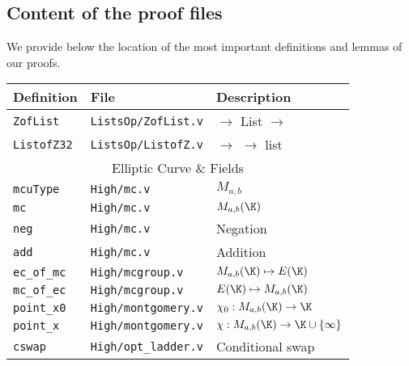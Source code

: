 
\subsection{Content of the proof files}
\label{appendix:proof-files}

We provide below the location of the most important definitions and lemmas of our proofs.

\begin{table*}[h]
  \begin{tabular}{ l | l | l }
    Definition & File & Description \\
    \hline
    \texttt{ZofList} & \texttt{ListsOp/ZofList.v} & \Z $\rightarrow$ List \Z $\rightarrow$ \Z\\
    \texttt{ListofZ32} & \texttt{ListsOp/ListofZ.v} & \Z $\rightarrow$  \Z $\rightarrow$ list \Z\\
    \hline
    \multicolumn{3}{c}{Elliptic Curve \& Fields }\\
    \hline
    \texttt{mcuType} & \texttt{High/mc.v} & $M_{a,b}$ \\
    \texttt{mc} & \texttt{High/mc.v} & $M_{a,b}(\K)$ \\
    \texttt{neg} & \texttt{High/mc.v} & Negation \\
    \texttt{add} & \texttt{High/mc.v} & Addition \\
    \texttt{ec\_of\_mc} & \texttt{High/mcgroup.v} & $M_{a,b}(\K) \mapsto E(\K)$ \\
    \texttt{mc\_of\_ec} & \texttt{High/mcgroup.v} & $E(\K) \mapsto M_{a,b}(\K)$ \\
    \texttt{point\_x0} & \texttt{High/montgomery.v} & $\chi_0 : M_{a,b}(\K) \to \K$ \\
    \texttt{point\_x} & \texttt{High/montgomery.v} & $\chi : M_{a,b}(\K) \to \K \cup \{\infty\}$ \\
    \texttt{cswap} & \texttt{High/opt\_ladder.v} & Conditional swap \\

\end{tabular}
\end{table*}
